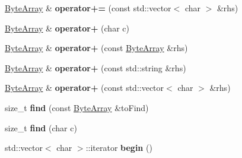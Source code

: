 \begin{DoxyCompactItemize}
\mbox{\hyperlink{class_cpp_serial_port_1_1_byte_array}{Byte\+Array}} \& {\bfseries operator+=} (const std\+::vector$<$ char $>$ \&rhs)
\item 
\mbox{\label{class_cpp_serial_port_1_1_byte_array_a39f7aafe01f4820efcf8c8ff3f96d0f2}} 
\mbox{\hyperlink{class_cpp_serial_port_1_1_byte_array}{Byte\+Array}} \& {\bfseries operator+} (char c)
\item 
\mbox{\label{class_cpp_serial_port_1_1_byte_array_ac5efe720d49ff50a9538385236010744}} 
\mbox{\hyperlink{class_cpp_serial_port_1_1_byte_array}{Byte\+Array}} \& {\bfseries operator+} (const \mbox{\hyperlink{class_cpp_serial_port_1_1_byte_array}{Byte\+Array}} \&rhs)
\item 
\mbox{\label{class_cpp_serial_port_1_1_byte_array_a4fbd9e26d0671a4737fa652c3719a4ee}} 
\mbox{\hyperlink{class_cpp_serial_port_1_1_byte_array}{Byte\+Array}} \& {\bfseries operator+} (const std\+::string \&rhs)
\item 
\mbox{\label{class_cpp_serial_port_1_1_byte_array_af2da5468dde68c869a4037923292c1ab}} 
\mbox{\hyperlink{class_cpp_serial_port_1_1_byte_array}{Byte\+Array}} \& {\bfseries operator+} (const std\+::vector$<$ char $>$ \&rhs)
\item 
\mbox{\label{class_cpp_serial_port_1_1_byte_array_a8065fa7a92390e122d34ebc49c6cf6d5}} 
size\+\_\+t {\bfseries find} (const \mbox{\hyperlink{class_cpp_serial_port_1_1_byte_array}{Byte\+Array}} \&to\+Find)
\item 
\mbox{\label{class_cpp_serial_port_1_1_byte_array_ad2f25aae1da2bbf4544ddd3d25bd8513}} 
size\+\_\+t {\bfseries find} (char c)
\item 
\mbox{\label{class_cpp_serial_port_1_1_byte_array_a647c1192a45b6307d1f19177b8408354}} 
std\+::vector$<$ char $>$\+::iterator {\bfseries begin} ()
\item 
\mbox{\label{class_cpp_serial_port_1_1_byte_array_adbc9bf23f4acbfd80e846c0102b82808}} 

\end{DoxyCompactItemize}
